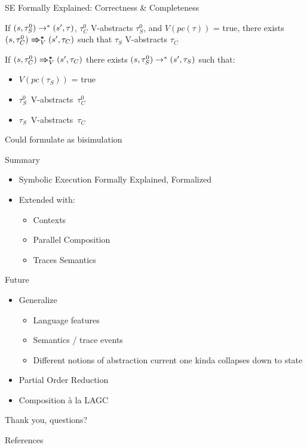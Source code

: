 \documentclass{beamer}
\renewcommand{\note}[1]{{\color{orange}#1}}
\newcommand{\pc}[1]{\ensuremath{pc(#1)}}
\begin{document}
\begin{frame}{SE Formally Explained: Correctness \& Completeness}
  \begin{theorem}[Correctness]
    If $\Sstar{(s, \tau_{S}^{0})}{(s', \tau)}$, $\tau_{C}^{0}$ V-abstracts $\tau_{S}^{0}$, and $V(\pc{\tau})$ = true, there exists $\Cstar[V]{(s, \tau_{C}^{0})}{(s', \tau_{C})}$ such that $\tau_{S}$ V-abstracts $\tau_{C}$
  \end{theorem}
  \vfill
  \begin{theorem}[Completeness]
    If $\Cstar[V]{(s, \tau_{C}^{0})}{(s', \tau_{C})}$ there exists $\Sstar{(s, \tau_{S}^{0})}{(s', \tau_{S})}$ such that:
    \begin{itemize}
      \item $V(\pc{\tau_S})$ = true
      \item $\tau_S^0$~V-abstracts~$\tau_C^0$
      \item $\tau_S$~V-abstracts~$\tau_C$
    \end{itemize}
  \end{theorem}
  \note{Could formulate as bisimulation}
\end{frame}

\begin{frame}{Summary}
  \begin{itemize}
    \item Symbolic Execution Formally Explained, Formalized
    \item Extended with:
          \begin{itemize}
            \item Contexts
            \item Parallel Composition
            \item Traces Semantics
          \end{itemize}
  \end{itemize}
\end{frame}

\begin{frame}{Future}
  \begin{itemize}
    \item Generalize
          \begin{itemize}
            \item Language features
            \item Semantics / trace events
            \item Different notions of abstraction
                  \note{current one kinda collapses down to state}
          \end{itemize}
    \item \alert{Partial Order Reduction}
    \item Composition à la LAGC
  \end{itemize}
\end{frame}

\begin{frame}
  Thank you, questions?
\end{frame}

\begin{frame}{References}
  \printbibliography{}
\end{frame}
\end{document}
